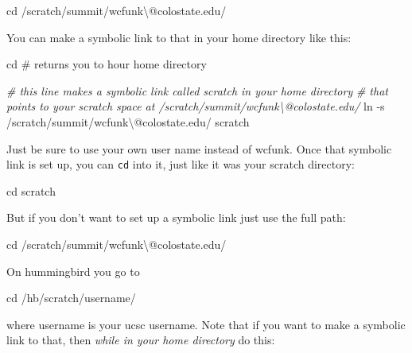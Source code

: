 \documentclass[]{krantz}
\makeatletter
\newenvironment{Shaded}{\begin{snugshade}}{\end{snugshade}}
\newcommand{\BuiltInTok}[1]{#1}
\newcommand{\CommentTok}[1]{\textcolor[rgb]{0.37,0.37,0.37}{\textit{#1}}}
\newcommand{\FunctionTok}[1]{\textcolor[rgb]{0,0,0}{#1}}
\newcommand{\NormalTok}[1]{#1}
\newenvironment{kframe}{%
\medskip{}
\setlength{\fboxsep}{.8em}
 \def\at@end@of@kframe{}%
 \ifinner\ifhmode%
  \def\at@end@of@kframe{\end{minipage}}%
  \begin{minipage}{\columnwidth}%
 \fi\fi%
 \def\FrameCommand##1{\hskip\@totalleftmargin \hskip-\fboxsep
 \colorbox{shadecolor}{##1}\hskip-\fboxsep
     \hskip-\linewidth \hskip-\@totalleftmargin \hskip\columnwidth}%
 \MakeFramed {\advance\hsize-\width
   \@totalleftmargin\z@ \linewidth\hsize
   \@setminipage}}%
 {\par\unskip\endMakeFramed%
 \at@end@of@kframe}
\renewenvironment{Shaded}{\begin{kframe}}{\end{kframe}}
\makeatother
\begin{document}
\begin{enumerate}
\begin{Shaded}
\begin{Highlighting}[]
\BuiltInTok{cd}\NormalTok{ /scratch/summit/wcfunk\textbackslash{}@colostate.edu/}
\end{Highlighting}
\end{Shaded}

  You can make a symbolic link to that in your home directory like this:

\begin{Shaded}
\begin{Highlighting}[]
\BuiltInTok{cd}\NormalTok{  # returns you to hour home directory}

\CommentTok{# this line makes a symbolic link called scratch in your home directory}
\CommentTok{# that points to your scratch space at /scratch/summit/wcfunk\textbackslash{}@colostate.edu/}
\FunctionTok{ln}\NormalTok{ -s /scratch/summit/wcfunk\textbackslash{}@colostate.edu/ scratch}
\end{Highlighting}
\end{Shaded}

  Just be sure to use your own user name instead of wcfunk. Once that symbolic link is set up, you can
  \texttt{cd} into it, just like it was your scratch directory:

\begin{Shaded}
\begin{Highlighting}[]
\BuiltInTok{cd}\NormalTok{ scratch}
\end{Highlighting}
\end{Shaded}

  But if you don't want to set up a symbolic link just use the full path:

\begin{Shaded}
\begin{Highlighting}[]
\BuiltInTok{cd}\NormalTok{ /scratch/summit/wcfunk\textbackslash{}@colostate.edu/}
\end{Highlighting}
\end{Shaded}

  On hummingbird you go to

\begin{Shaded}
\begin{Highlighting}[]
\BuiltInTok{cd}\NormalTok{ /hb/scratch/username/}
\end{Highlighting}
\end{Shaded}

  where username is your ucsc username. Note that if you want to make a symbolic link to that, then
  \emph{while in your home directory} do this:


\end{enumerate}
\end{document}
